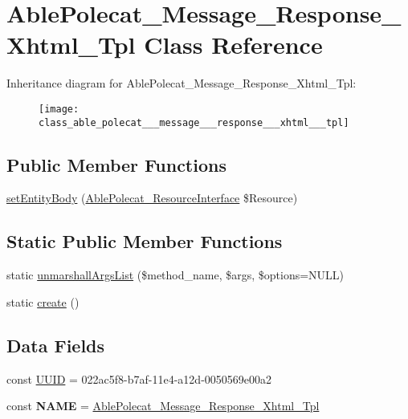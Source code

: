 \hypertarget{class_able_polecat___message___response___xhtml___tpl}{}\section{Able\+Polecat\+\_\+\+Message\+\_\+\+Response\+\_\+\+Xhtml\+\_\+\+Tpl Class Reference}
\label{class_able_polecat___message___response___xhtml___tpl}
Inheritance diagram for Able\+Polecat\+\_\+\+Message\+\_\+\+Response\+\_\+\+Xhtml\+\_\+\+Tpl\+:\begin{figure}[H]
\begin{center}
\leavevmode
\texttt{[image: class\_able\_polecat\_\_\_message\_\_\_response\_\_\_xhtml\_\_\_tpl]}
\end{center}
\end{figure}
\subsection*{Public Member Functions}
\begin{DoxyCompactItemize}
\item 
\hyperlink{class_able_polecat___message___response___xhtml___tpl_a858ab2a95af7d312509c203de5c6fb11}{set\+Entity\+Body} (\hyperlink{interface_able_polecat___resource_interface}{Able\+Polecat\+\_\+\+Resource\+Interface} \$Resource)
\end{DoxyCompactItemize}
\subsection*{Static Public Member Functions}
\begin{DoxyCompactItemize}
\item 
static \hyperlink{class_able_polecat___message___response___xhtml___tpl_a94d2e558bba777f54dcc10f1bfc4dca5}{unmarshall\+Args\+List} (\$method\+\_\+name, \$args, \$options=N\+U\+L\+L)
\item 
static \hyperlink{class_able_polecat___message___response___xhtml___tpl_a239b1c70258014a86569483c2d009de6}{create} ()
\end{DoxyCompactItemize}
\subsection*{Data Fields}
\begin{DoxyCompactItemize}
\item 
const \hyperlink{class_able_polecat___message___response___xhtml___tpl_a74b892c8c0b86bf9d04c5819898c51e7}{U\+U\+I\+D} = \textquotesingle{}022ac5f8-\/b7af-\/11e4-\/a12d-\/0050569e00a2\textquotesingle{}
\item 
\hypertarget{class_able_polecat___message___response___xhtml___tpl_a244352f035b82b20b0efa506167fd862}{}const {\bfseries N\+A\+M\+E} = \textquotesingle{}\hyperlink{class_able_polecat___message___response___xhtml___tpl}{Able\+Polecat\+\_\+\+Message\+\_\+\+Response\+\_\+\+Xhtml\+\_\+\+Tpl}\textquotesingle{}\label{class_able_polecat___message___response___xhtml___tpl_a244352f035b82b20b0efa506167fd862}

\end{DoxyCompactItemize}
